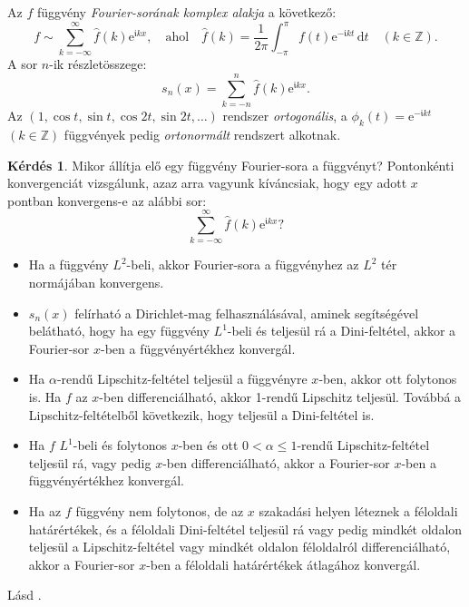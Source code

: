 \documentclass[DIV=15,appendixprefix]{scrreprt}
\theoremstyle{definition}
\newtheorem*{kerdes}{Kérdés}
\theoremstyle{remark}
\newcommand{\imag}{\mathfrak{i}}
\begin{document}
Az $ f $ függvény \emph{Fourier-sorának komplex alakja} a következő:
\begin{equation*}
	f \sim \sum_{ k = - \infty }^{ \infty } \hat{ f } \left( k \right) \mathrm{ e }^{ \imag k x},
	\quad \text{ahol} \quad \hat{ f } \left( k \right) = \frac{ 1 }{ 2 \pi } \int_{ - \pi }^{ \pi }
	f \left( t \right)  \mathrm{ e }^{ - \imag k t} \, \mathrm{ d } t \quad \left( k \in
	\mathbb{ Z } \right).
\end{equation*}
A sor $n$-ik részletösszege:
\begin{equation*}
	s_{ n } \left( x \right)  = \sum_{ k = - n }^{ n } \hat{ f } \left( k \right)
	\mathrm{ e }^{ \imag k x}.
\end{equation*}
Az $ \left( 1,{} \cos t,{} \sin t,{} \cos 2t,{} \sin 2t,{} \ldots \right) $ rendszer
\emph{ortogonális}, a
$\phi_{ k } \left( t \right) = \mathrm{ e }^{ - \imag k t} $ $ \left( k \in \mathbb{ Z } \right) $
függvények pedig \emph{ortonormált} rendszert alkotnak.
\begin{kerdes}
	Mikor állítja elő egy függvény Fourier-sora a függvényt? Pontonkénti konvergenciát vizsgálunk,
	azaz arra vagyunk kíváncsiak, hogy egy adott $ x $ pontban konvergens-e az alábbi sor:
	\begin{equation*}
		\sum_{ k = - \infty }^{ \infty } \hat{ f } \left( k \right) \mathrm{ e }^{ \imag k x}?
	\end{equation*}
\end{kerdes}
\begin{itemize}
	\item Ha a függvény $ L^{ 2 } $-beli, akkor Fourier-sora a függvényhez az $ L^{ 2 } $ tér
		normájában konvergens.
	\item $ s_{ n } \left( x \right) $ felírható a Dirichlet-mag felhasználásával, aminek
		segítségével belátható, hogy ha egy függvény $ L^{ 1 } $-beli és teljesül rá a
		Dini-feltétel, akkor a Fourier-sor $ x $-ben a függvényértékhez konvergál.
	\item Ha $ \alpha $-rendű Lipschitz-feltétel teljesül a függvényre $ x $-ben, akkor ott
		folytonos is. Ha $ f $  az $ x $-ben differenciálható, akkor 1-rendű Lipschitz teljesül.
		Továbbá a Lipschitz-feltételből következik, hogy teljesül a Dini-feltétel is.
	\item Ha $ f $ $ L^{ 1 } $-beli és folytonos $ x $-ben és ott $ 0< \alpha \le 1 $-rendű
		Lipschitz-feltétel teljesül rá, vagy pedig $ x $-ben differenciálható, akkor a Fourier-sor
		$ x $-ben a függvényértékhez konvergál.
	\item Ha az $ f $ függvény nem folytonos, de az $ x $ szakadási helyen léteznek a féloldali
		határértékek, és a féloldali Dini-feltétel teljesül rá vagy pedig mindkét oldalon teljesül a
		Lipschitz-feltétel vagy mindkét oldalon féloldalról differenciálható, akkor a Fourier-sor
		$ x $-ben a féloldali határértékek átlagához konvergál.
\end{itemize}
%
Lásd \cite[4.1. és 4.5.~szakaszok]{SzTNZ}.
\end{document}
